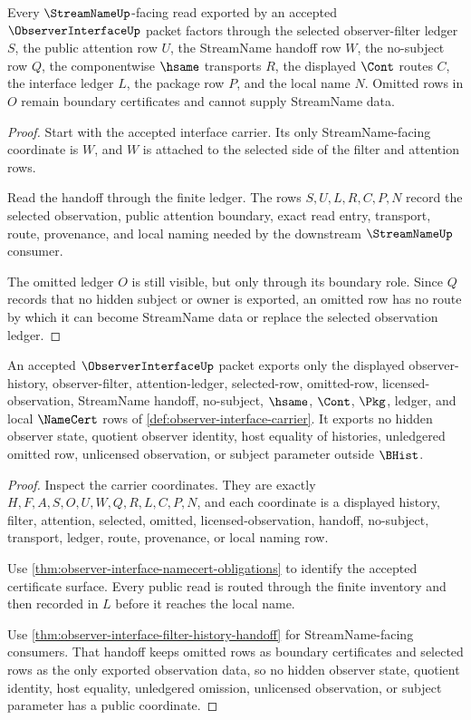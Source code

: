 \begin{theorem}
\label{thm:observer-interface-filter-history-handoff}
Every $\StreamNameUp$-facing read exported by an accepted $\ObserverInterfaceUp$ packet factors through the selected observer-filter ledger $S$, the public attention row $U$, the StreamName handoff row $W$, the no-subject row $Q$, the componentwise $\hsame$ transports $R$, the displayed $\Cont$ routes $C$, the interface ledger $L$, the package row $P$, and the local name $N$. Omitted rows in $O$ remain boundary certificates and cannot supply StreamName data.
\end{theorem}
\begin{proof}
Start with the accepted interface carrier. Its only StreamName-facing coordinate is $W$, and $W$ is attached to the selected side of the filter and attention rows.

Read the handoff through the finite ledger. The rows $S,U,L,R,C,P,N$ record the selected observation, public attention boundary, exact read entry, transport, route, provenance, and local naming needed by the downstream $\StreamNameUp$ consumer.

The omitted ledger $O$ is still visible, but only through its boundary role. Since $Q$ records that no hidden subject or owner is exported, an omitted row has no route by which it can become StreamName data or replace the selected observation ledger.
\end{proof}

\begin{theorem}
\label{thm:observer-interface-nonescape}
An accepted $\ObserverInterfaceUp$ packet exports only the displayed observer-history, observer-filter, attention-ledger, selected-row, omitted-row, licensed-observation, StreamName handoff, no-subject, $\hsame$, $\Cont$, $\Pkg$, ledger, and local $\NameCert$ rows of \autoref{def:observer-interface-carrier}. It exports no hidden observer state, quotient observer identity, host equality of histories, unledgered omitted row, unlicensed observation, or subject parameter outside $\BHist$.
\end{theorem}
\begin{proof}
Inspect the carrier coordinates. They are exactly $H,F,A,S,O,U,W,Q,R,L,C,P,N$, and each coordinate is a displayed history, filter, attention, selected, omitted, licensed-observation, handoff, no-subject, transport, ledger, route, provenance, or local naming row.

Use \autoref{thm:observer-interface-namecert-obligations} to identify the accepted certificate surface. Every public read is routed through the finite inventory and then recorded in $L$ before it reaches the local name.

Use \autoref{thm:observer-interface-filter-history-handoff} for StreamName-facing consumers. That handoff keeps omitted rows as boundary certificates and selected rows as the only exported observation data, so no hidden observer state, quotient identity, host equality, unledgered omission, unlicensed observation, or subject parameter has a public coordinate.
\end{proof}

